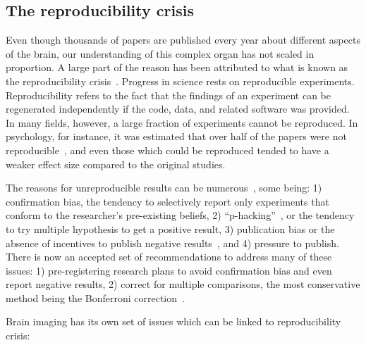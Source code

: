 \subsection*{The reproducibility crisis}
\label{sec:sommaire:reproducibility_crisis}
Even though thousands of papers are published every year about different aspects of the brain, our understanding of this complex organ has not scaled in proportion. A large part of the reason has been attributed to what is known as the reproducibility crisis~\citep{ioannidis2005most, simmons2011false, button2013power}. %
Progress in science rests on reproducible experiments. Reproducibility refers to the fact that the findings of an experiment can be regenerated independently if the code, data, and related software was provided. In many fields, however, a large fraction of experiments cannot be reproduced. In psychology, for instance, it was estimated that over half of the papers were not reproducible~\citep{open2015estimating}, and even those which could be reproduced tended to have a weaker effect size compared to the original studies. 

The reasons for unreproducible results can be numerous~\citep{baker20161}, some being: 1) confirmation bias, the tendency to selectively report only experiments that conform to the researcher's pre-existing beliefs, 2) ``p-hacking''~\citep{simmons2011false}, or the tendency to try multiple hypothesis to get a positive result, 3) publication bias or the absence of incentives to publish negative results~\citep{rosenthal1979file}, and 4) pressure to publish. There is now an accepted set of recommendations to address many of these issues: 1) pre-registering research plans to avoid confirmation bias and even report negative results, 2) correct for multiple comparisons, the most conservative method being the Bonferroni correction~\citep{dunn1961multiple}. 

Brain imaging has its own set of issues which can be linked to reproducibility crisis: 


